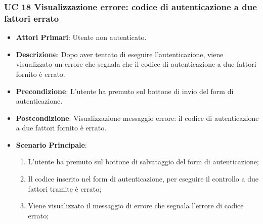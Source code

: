 
		\subsubsection{UC 18 Visualizzazione errore: codice di autenticazione a due fattori errato}
		\begin{itemize}
			\item \textbf{Attori Primari}: Utente non autenticato.
			\item \textbf{Descrizione}: Dopo aver tentato di eseguire l'autenticazione, viene visualizzato un errore che segnala che il codice di autenticazione a due fattori fornito è errato.
			\item \textbf{Precondizione}: L'utente ha premuto sul bottone di invio del form di autenticazione.
			\item \textbf{Postcondizione}: Visualizzazione messaggio errore: il codice di autenticazione a due fattori fornito è errato.
			\item \textbf{Scenario Principale}:
			\begin{enumerate}
				\item L'utente ha premuto sul bottone di salvataggio del form di autenticazione;
				\item Il codice inserito nel form di autenticazione, per eseguire il controllo a due fattori tramite  è errato;
				\item Viene visualizzato il messaggio di errore che segnala l'errore di codice errato;
			\end{enumerate}
		\end{itemize}